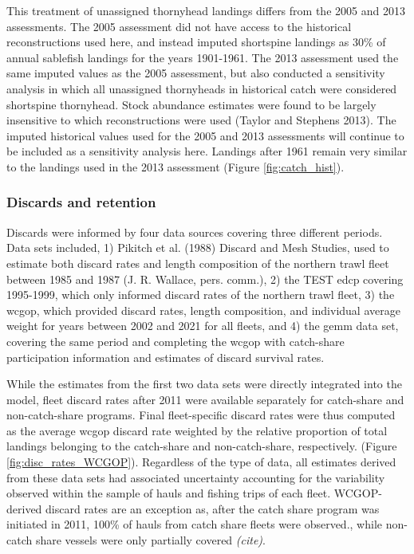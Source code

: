\documentclass[11pt,
  english,
  letterpaper,
]{article}
\begin{document}
This treatment of unassigned thornyhead landings differs from the 2005 and 2013 assessments. The 2005 assessment did not have access to the historical reconstructions used here, and instead imputed shortspine landings as 30\% of annual sablefish landings for the years 1901-1961. The 2013 assessment used the same imputed values as the 2005 assessment, but also conducted a sensitivity analysis in which all unassigned thornyheads in historical catch were considered shortspine thornyhead. Stock abundance estimates were found to be largely insensitive to which reconstructions were used (Taylor and Stephens 2013). The imputed historical values used for the 2005 and 2013 assessments will continue to be included as a sensitivity analysis here. Landings after 1961 remain very similar to the landings used in the 2013 assessment (Figure \ref{fig:catch_hist}).

\hypertarget{discards-and-retention}{%
\subsubsection{Discards and retention}\label{discards-and-retention}}

Discards were informed by four data sources covering three different periods. Data sets included, 1) Pikitch et al. (1988) Discard and Mesh Studies, used to estimate both discard rates and length composition of the northern trawl fleet between 1985 and 1987 (J. R. Wallace, pers. comm.), 2) the TEST \gls{edcp} covering 1995-1999, which only informed discard rates of the northern trawl fleet, 3) the \gls{wcgop}, which provided discard rates, length composition, and individual average weight for years between 2002 and 2021 for all fleets, and 4) the \gls{gemm} data set, covering the same period and completing the \gls{wcgop} with catch-share participation information and estimates of discard survival rates.

While the estimates from the first two data sets were directly integrated into the model, fleet discard rates after 2011 were available separately for catch-share and non-catch-share programs. Final fleet-specific discard rates were thus computed as the average \gls{wcgop} discard rate weighted by the relative proportion of total landings belonging to the catch-share and non-catch-share, respectively. (Figure \ref{fig:disc_rates_WCGOP}). Regardless of the type of data, all estimates derived from these data sets had associated uncertainty accounting for the variability observed within the sample of hauls and fishing trips of each fleet. WCGOP-derived discard rates are an exception as, after the catch share program was initiated in 2011, 100\% of hauls from catch share fleets were observed., while non-catch share vessels were only partially covered \emph{\emph{(cite)}}.
\end{document}
